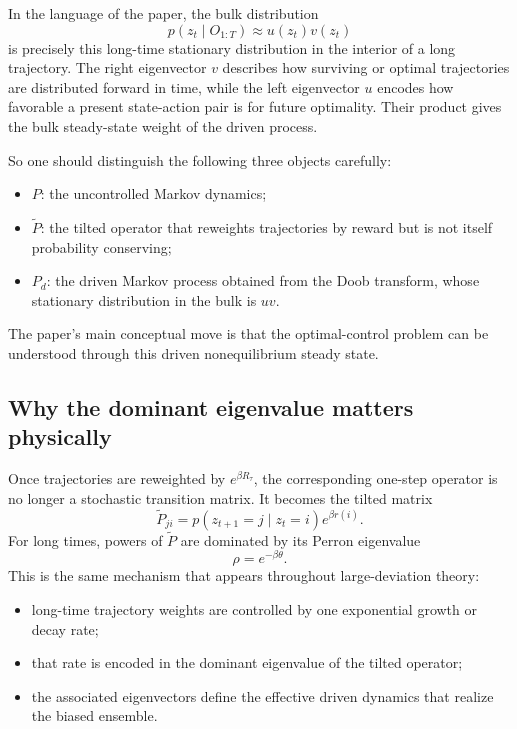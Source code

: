 \documentclass[11pt]{article}
\begin{document}
In the language of the paper, the bulk distribution
\begin{equation}
    p(z_t\mid O_{1:T})\approx u(z_t)v(z_t)
\end{equation}
is precisely this long-time stationary distribution in the interior of a long trajectory. The
right eigenvector \(v\) describes how surviving or optimal trajectories are distributed forward
in time, while the left eigenvector \(u\) encodes how favorable a present state-action pair is
for future optimality. Their product gives the bulk steady-state weight of the driven process.

So one should distinguish the following three objects carefully:
\begin{itemize}
    \item \(P\): the uncontrolled Markov dynamics;
    \item \(\widetilde P\): the tilted operator that reweights trajectories by reward but is not
    itself probability conserving;
    \item \(P_d\): the driven Markov process obtained from the Doob transform, whose stationary
    distribution in the bulk is \(uv\).
\end{itemize}
The paper's main conceptual move is that the optimal-control problem can be understood through
this driven nonequilibrium steady state.

\subsection*{Why the dominant eigenvalue matters physically}

Once trajectories are reweighted by \(e^{\beta R_\tau}\), the corresponding one-step operator
is no longer a stochastic transition matrix. It becomes the tilted matrix
\[
    \widetilde{P}_{ji}=p(z_{t+1}=j\mid z_t=i)e^{\beta r(i)}.
\]
For long times, powers of \(\widetilde{P}\) are dominated by its Perron eigenvalue
\[
\rho=e^{-\beta\theta}.
\]
This is the same mechanism that appears throughout large-deviation theory:
\begin{itemize}
    \item long-time trajectory weights are controlled by one exponential growth or decay rate;
    \item that rate is encoded in the dominant eigenvalue of the tilted operator;
    \item the associated eigenvectors define the effective driven dynamics that realize the
    biased ensemble.
\end{itemize}
\end{document}
